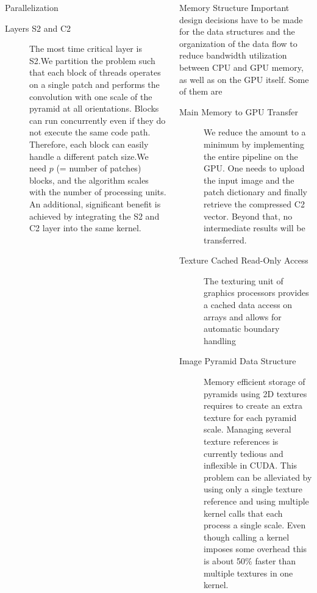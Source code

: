 \documentclass[final]{beamer}
\begin{document}
\begin{frame}{}
\begin{columns}[t]
\begin{column}{.48\linewidth}
\begin{block}{Parallelization}
\begin{description}
\item [ Layers S2 and C2]
The most time critical layer is S2.We partition the problem such that each block of threads operates on a
single patch and performs the convolution with one scale of the
pyramid at all orientations. Blocks can run concurrently even if they do not execute the same code path. 
Therefore, each block can easily handle a different patch size.We need $p$ (= number of patches) blocks, and the algorithm scales
with the number of processing units. \newline
An additional, significant benefit is achieved by integrating the S2
and C2 layer into the same kernel.

\end{description}

        \end{block}        
        
        
      \end{column}
      
      
      \begin{column}{.48\linewidth}
        \begin{block}{Memory Structure}
          Important design decisions have to be made for the data structures and
the organization of the data flow to reduce bandwidth utilization
between CPU and GPU memory, as well as on the GPU itself. Some of them are
\begin{description}
\item[ Main Memory to GPU Transfer ] 
We reduce the amount to a minimum by
implementing the entire pipeline on the GPU. One needs to upload the input image and the patch
dictionary  and finally retrieve the compressed C2
vector. Beyond that, no intermediate results will be transferred.  
\item[ Texture Cached Read-Only Access]
The texturing unit of graphics processors provides a cached data access
on arrays and allows for automatic boundary handling
\item [ Image Pyramid Data Structure]
Memory efficient storage of pyramids using 2D textures requires to
create an extra texture for each pyramid scale. Managing several
texture references is currently tedious and inflexible in CUDA.  This
problem can be alleviated by using only a single texture reference and
using multiple kernel calls that each process a single scale.  Even
though calling a kernel imposes some overhead this is about 50\%
faster than multiple textures in one kernel.\newline
\end{description}
        \end{block}




\end{column}
\end{columns}
\end{frame}
\end{document}
